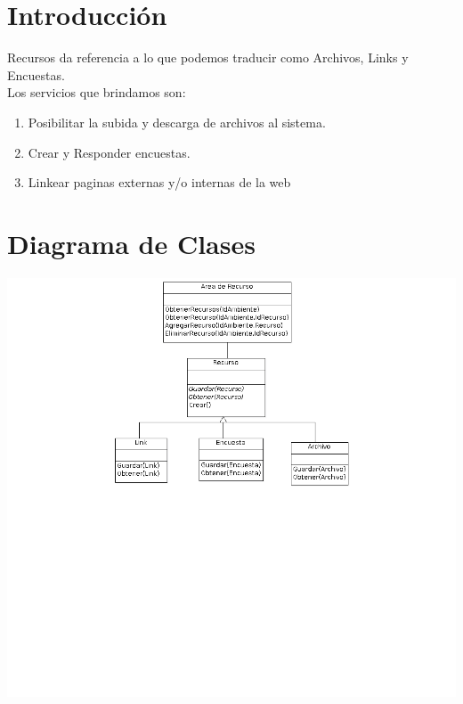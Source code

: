 \documentclass{article}
\begin{document}
\section{Introducci\'on}
Recursos da referencia a lo que podemos traducir como Archivos, Links y Encuestas.\\
Los servicios que brindamos son:
\begin{enumerate}
	\item Posibilitar la subida y descarga de archivos al sistema.
	\item Crear y Responder encuestas.
	\item Linkear paginas externas y/o internas de la web
\end{enumerate}

\section{Diagrama de Clases}
	\includegraphics[scale=0.5]{Diagramadeclase2.png}
\end{document}
